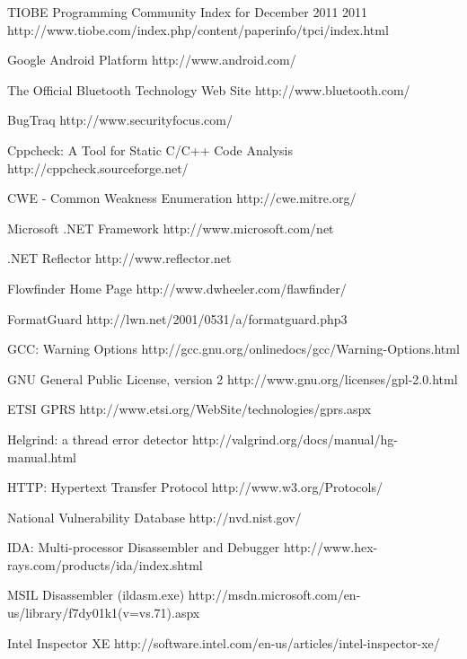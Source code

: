 \begin{thebibliography}{9}
		{TIOBE Programming Community Index for December 2011}
		{2011}
		{http://www.tiobe.com/index.php/content/paperinfo/tpci/index.html}
	

		{Google Android Platform}
		{http://www.android.com/}
	
		{The Official Bluetooth Technology Web Site}
		{http://www.bluetooth.com/}

		{BugTraq}
		{http://www.securityfocus.com/}

		{Cppcheck: A Tool for Static C/C++ Code Analysis}
		{http://cppcheck.sourceforge.net/}

		{CWE - Common Weakness Enumeration}
		{http://cwe.mitre.org/}
	
		{Microsoft .NET Framework}
		{http://www.microsoft.com/net}

		{.NET Reflector}
		{http://www.reflector.net}

		{Flowfinder Home Page}
		{http://www.dwheeler.com/flawfinder/}

		{FormatGuard}
		{http://lwn.net/2001/0531/a/formatguard.php3}

		{GCC: Warning Options}
		{http://gcc.gnu.org/onlinedocs/gcc/Warning-Options.html}

		{GNU General Public License, version 2}
		{http://www.gnu.org/licenses/gpl-2.0.html}

		{ETSI GPRS}
		{http://www.etsi.org/WebSite/technologies/gprs.aspx}

		{Helgrind: a thread error detector}
		{http://valgrind.org/docs/manual/hg-manual.html}

		{HTTP: Hypertext Transfer Protocol}
		{http://www.w3.org/Protocols/}

		{National Vulnerability Database}
		{http://nvd.nist.gov/}

		{IDA: Multi-processor Disassembler and Debugger}
		{http://www.hex-rays.com/products/ida/index.shtml}

		{MSIL Disassembler (ildasm.exe)}
		{http://msdn.microsoft.com/en-us/library/f7dy01k1(v=vs.71).aspx}

		{Intel Inspector XE}
		{http://software.intel.com/en-us/articles/intel-inspector-xe/}
	

\end{thebibliography}
